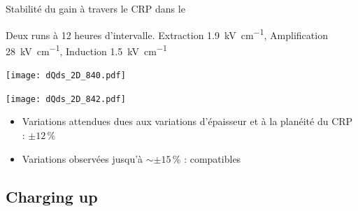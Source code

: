     \begin{frame}{Stabilité du gain à travers le CRP dans le \TOO{}}
        \begin{scriptsize}
            \centering Deux runs à 12 heures d'intervalle. Extraction \SI{1.9}{\kilo\volt\per\centi\meter}, Amplification \SI{28}{\kilo\volt\per\centi\meter}, Induction \SI{1.5}{\kilo\volt\per\centi\meter}\\\vspace{0.2cm}
            \begin{center} \vspace{-0.5cm}\texttt{[image: dQds\_2D\_840.pdf]} \end{center}
            \begin{center} \vspace{-0.5cm}\texttt{[image: dQds\_2D\_842.pdf]} \end{center}
            \vspace{-0.5cm}
            \begin{itemize}
    			\item Variations attendues dues aux variations d'épaisseur et à la planéité du CRP : $\pm 12 \,\%$
    			\item Variations observées jusqu'à $\sim \pm15\,\%$ : compatibles
			\end{itemize}
        \end{scriptsize}
    \end{frame}

  \subsection{Charging up}


